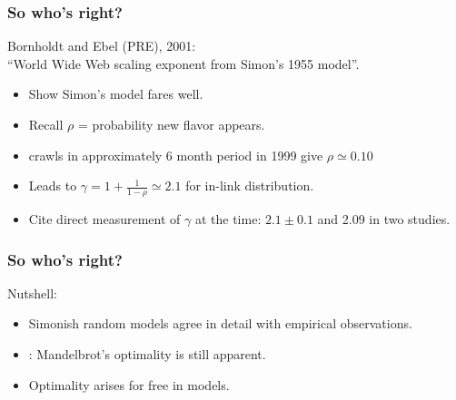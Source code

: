 \begin{frame}
  \frametitle{So who's right?}

  \begin{block}{}
  Bornholdt and Ebel (PRE), 2001:\\
  ``World {W}ide {W}eb scaling exponent from {S}imon's 1955 model''\cite{bornholdt2001a}.

  \begin{itemize}
  \item<2->
    Show Simon's model fares well.
  \item<3->
    Recall $\rho$ = probability new flavor appears.
  \item<4->
     crawls in approximately 6 month period in 1999
    give $\rho \simeq 0.10$
  \item<5->
    Leads to $\gamma = 1 + \frac{1}{1-\rho} \simeq 2.1$ for in-link distribution.
  \item<6->
    Cite direct measurement of $\gamma$ at the time: $2.1 \pm 0.1$ and 2.09
    in two studies.
  \end{itemize}
  \end{block}

\end{frame}

\begin{frame}
  \frametitle{So who's right?}

  \begin{block}{Nutshell:}
    \begin{itemize}
    \item<1->
      Simonish random  models
      agree in detail with empirical observations.
    \item<2->
      : Mandelbrot's optimality is still apparent.
    \item<3->
      Optimality arises for free in
       models.
    \end{itemize}
  \end{block}

\end{frame}


